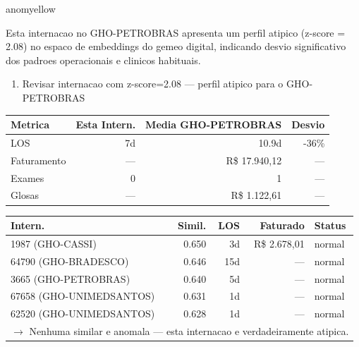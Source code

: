 \documentclass[a4paper,10pt]{article}
\begin{document}
\begin{anomalycard}[Internacao 166871 | GHO-PETROBRAS | MODERADO (z=2.08)]{anomyellow}
\vspace{2pt}\begin{tcolorbox}[colback=severityred!20,colframe=anomyellow,title={\textbf{Interpretacao de Negocio}},fonttitle=\bfseries\small,left=4pt,right=4pt,top=3pt,bottom=3pt]
{\small Esta internacao no GHO-PETROBRAS apresenta um perfil atipico (z-score = 2.08) no espaco de embeddings do gemeo digital, indicando desvio significativo dos padroes operacionais e clinicos habituais.}
\end{tcolorbox}
\begin{tcolorbox}[colback=severityyellow!30,colframe=anomorange,title={\textbf{Recomendacoes Especificas}},fonttitle=\bfseries\small,left=4pt,right=4pt,top=3pt,bottom=3pt]
\begin{enumerate}[nosep,leftmargin=16pt]
\item {\small Revisar internacao com z-score=2.08 --- perfil atipico para o GHO-PETROBRAS}
\end{enumerate}
\end{tcolorbox}
\begin{center}\begin{tabular}{l r r r}\toprule\textbf{Metrica} & \textbf{Esta Intern.} & \textbf{Media GHO-PETROBRAS} & \textbf{Desvio} \\\midrule
LOS & 7d & 10.9d & -36\% \\
Faturamento & --- & R\$ 17.940,12 & --- \\
Exames & 0 & 1 & --- \\
Glosas & --- & R\$ 1.122,61 & --- \\
\bottomrule\end{tabular}\end{center}

\begin{tabular}{l r r r l}\toprule\textbf{Intern.} & \textbf{Simil.} & \textbf{LOS} & \textbf{Faturado} & \textbf{Status} \\\midrule
1987 (GHO-CASSI) & 0.650 & 3d & R\$ 2.678,01 & \textcolor{jcubeblue}{normal} \\
64790 (GHO-BRADESCO) & 0.646 & 15d & --- & \textcolor{jcubeblue}{normal} \\
3665 (GHO-PETROBRAS) & 0.640 & 5d & --- & \textcolor{jcubeblue}{normal} \\
67658 (GHO-UNIMEDSANTOS) & 0.631 & 1d & --- & \textcolor{jcubeblue}{normal} \\
62520 (GHO-UNIMEDSANTOS) & 0.628 & 1d & --- & \textcolor{jcubeblue}{normal} \\
\multicolumn{5}{l}{\textcolor{jcubeblue}{\small $\rightarrow$ Nenhuma similar e anomala --- esta internacao e verdadeiramente atipica.}} \\
\bottomrule\end{tabular}


\end{anomalycard}
\end{document}
